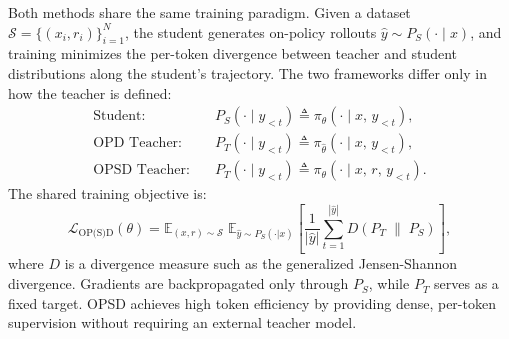 \documentclass[]{jingdong}
\begin{document}
Both methods share the same training paradigm.
Given a dataset $\mathcal{S} = \{(x_i, r_i)\}_{i=1}^{N}$, the student generates on-policy rollouts $\hat{y} \sim P_S(\cdot \mid x)$, and training minimizes the per-token divergence between teacher and student distributions along the student's trajectory.
The two frameworks differ only in how the teacher is defined:
\begin{align}
    \text{Student:} \quad & P_S(\cdot \mid y_{<t}) \triangleq \pi_\theta(\cdot \mid x,\, y_{<t}), \\
    \text{OPD Teacher:} \quad & P_T(\cdot \mid y_{<t}) \triangleq \pi_{\hat{\theta}}(\cdot \mid x,\, y_{<t}), \\
    \text{OPSD Teacher:} \quad & P_T(\cdot \mid y_{<t}) \triangleq \pi_\theta(\cdot \mid x,\, r,\, y_{<t}).
\end{align}
The shared training objective is:
\begin{equation}
    \mathcal{L}_{\text{OP(S)D}}(\theta) = \mathbb{E}_{(x,r)\sim\mathcal{S}}\;\mathbb{E}_{\hat{y}\sim P_S(\cdot|x)}\left[\frac{1}{|\hat{y}|}\sum_{t=1}^{|\hat{y}|} D\!\left(P_T \;\|\; P_S\right)\right],
    \label{eq:opsd}
\end{equation}
where $D$ is a divergence measure such as the generalized Jensen-Shannon divergence.
Gradients are backpropagated only through $P_S$, while $P_T$ serves as a fixed target.
OPSD achieves high token efficiency by providing dense, per-token supervision without requiring an external teacher model.
\end{document}
